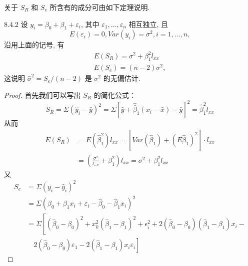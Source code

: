 关于 $S_R$ 和 $S_e$ 所含有的成分可由如下定理说明.
\begin{theorem}{}{8.4.2}
    设  $y_i = \beta_0 + \beta_1 + \varepsilon_i$, 其中  $\varepsilon_1, \ldots, \varepsilon_n$ 相互独立, 且
    \begin{equation*}
    E(\varepsilon_i) = 0, Var(y_i) = \sigma^2, i = 1, \ldots, n,
    \end{equation*}
    沿用上面的记号, 有
    \begin{align}
    E(S_R) = \sigma^2 + \beta_{1}^{2} l_{xx}\\
    E(S_e) = (n-2) \sigma^2,
    \end{align}
    这说明 $\hat{\sigma}^2 = S_{e}/(n-2)$ 是 $\sigma^2$ 的无偏估计.
\end{theorem}
\begin{proof}
    首先我们可以写出 $S_R$ 的简化公式：
    \begin{equation}
    S_{R}=\Sigma\left(\hat{y}_{i}-\bar{y}\right)^{2}=\Sigma\left[\bar{y}+\hat{\bar{\beta}}_{1}\left(x_{i}-\bar{x}\right)-\bar{y}\right]^{2}=\hat{\beta}_{1}^{2} l_{x x}
    \end{equation}\label{eq:8.4.16}
    从而
    \begin{equation*}
    \begin{aligned} 
    E\left(S_{R}\right) &=E\left(\hat{\beta}_{1}^{2}\right) l_{x x}=\left[Var\left(\hat{\beta}_{1}\right)+\left(E \hat{\beta}_{1}\right)^{2}\right] \cdot l_{x x} \\ 
    &=\left(\frac{\sigma^{2}}{l_{-x}}+\beta_{1}^{2}\right) l_{x x}=\sigma^{2}+\beta_{1}^{2} l_{x x} 
    \end{aligned}
    \end{equation*}
    又
    \begin{equation*}
    \begin{aligned} 
    S_{e} 
    & =\Sigma\left(y_{i}-\hat{y}_{i}\right)^{2} \\ 
    & =\Sigma\left(\beta_{0}+\beta_{1} x_{i}+\varepsilon_{i}-\hat{\beta}_{0}-\hat{\beta}_{1} x_{i}\right)^{2}\\ 
    & =\Sigma\left[\left(\hat{\beta}_{0}-\beta_{0}\right)^{2}+x_{k}^{2}\left(\hat{\beta}_{1}-\beta_{1}\right)^{2}+\epsilon_{i}^{2}+  2(\hat{\beta}_{0}-\beta_{0})\left(\hat{\beta}_{1}-\beta_{1}\right) x_{i}-\right.\\ 
    & \quad \left.2\left(\hat{\beta}_{0}-\beta_{0}\right) \varepsilon_{1}-2\left(\hat{\beta}_{1}-\beta_{1}\right) x_{i} \varepsilon_{i}\right] 
    \end{aligned}
    \end{equation*}

\end{proof}
